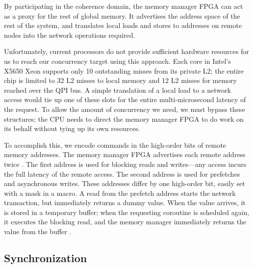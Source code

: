 \documentclass{acm_proc_article-sp}
\begin{document}
By participating in the coherence domain, the memory manager FPGA can
act as a proxy for the rest of global memory. It advertises the
address space of the rest of the system, and translates local loads
and stores to addresses on remote nodes into the network operations
required.

Unfortunately, current processors do not provide sufficient hardware
resources for us to reach our concurrency target using this
approach. Each core in Intel's X5650 Xeon supports only 10 outstanding
misses from its private L2; the entire chip is limited to 32 L2 misses
to local memory and 12 L2 misses for memory reached over the QPI
bus. A simple translation of a local load to a network access would
tie up one of these slots for the entire multi-microsecond latency of
the request. To allow the amount of concurrency we need, we must bypass these structures; the CPU needs to direct the memory manager FPGA
to do work on its behalf without tying up its own resources.

To accomplish this, we encode commands in the high-order bits of
remote memory addresses. The memory manager FPGA advertises each
remote address twice . The first address is used for blocking reads and
writes---any access incurs the full latency of the remote
access.  The second address is used for
prefetches and asynchronous writes. These addresses differ by one
high-order bit, easily set with a mask in a macro. A read from the
prefetch address starts the network transaction, but immediately
returns a dummy value. When the value arrives, it is stored in a
temporary buffer; when the requesting coroutine is scheduled again, it
executes the blocking read, and the memory manager immediately returns
the value from the buffer . 

\subsection{Synchronization}
\end{document}
